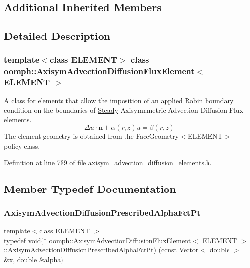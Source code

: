 \subsection*{Additional Inherited Members}


\subsection{Detailed Description}
\subsubsection*{template$<$class E\+L\+E\+M\+E\+NT$>$\newline
class oomph\+::\+Axisym\+Advection\+Diffusion\+Flux\+Element$<$ E\+L\+E\+M\+E\+N\+T $>$}

A class for elements that allow the imposition of an applied Robin boundary condition on the boundaries of \hyperlink{classoomph_1_1Steady}{Steady} Axisymmnetric Advection Diffusion Flux elements. \[ -\Delta u \cdot \mathbf{n} + \alpha(r,z) u = \beta(r,z) \] The element geometry is obtained from the Face\+Geometry$<$\+E\+L\+E\+M\+E\+N\+T$>$ policy class. 

Definition at line 789 of file axisym\+\_\+advection\+\_\+diffusion\+\_\+elements.\+h.



\subsection{Member Typedef Documentation}
\mbox{\label{classoomph_1_1AxisymAdvectionDiffusionFluxElement_aa0922f19043ccc259c61c704fa3b5767}} 
\subsubsection{\texorpdfstring{Axisym\+Advection\+Diffusion\+Prescribed\+Alpha\+Fct\+Pt}{AxisymAdvectionDiffusionPrescribedAlphaFctPt}}
{\footnotesize\ttfamily template$<$class E\+L\+E\+M\+E\+NT $>$ \\
typedef void($\ast$ \hyperlink{classoomph_1_1AxisymAdvectionDiffusionFluxElement}{oomph\+::\+Axisym\+Advection\+Diffusion\+Flux\+Element}$<$ E\+L\+E\+M\+E\+NT $>$\+::Axisym\+Advection\+Diffusion\+Prescribed\+Alpha\+Fct\+Pt) (const \hyperlink{classoomph_1_1Vector}{Vector}$<$ double $>$ \&x, double \&alpha)}



